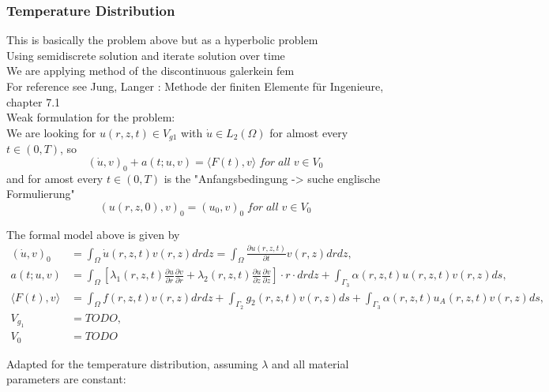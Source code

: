 \documentclass[parskip=half, titlepage=yes, 12pt, BCOR=12mm, DIV=calc]{scrartcl}
\begin{document}
\subsubsection{Temperature Distribution}

This is basically the problem above but as a hyperbolic problem \\
Using semidiscrete solution and iterate solution over time \\
We are applying method of the discontinuous galerkein fem \\
For reference see Jung, Langer : Methode der finiten Elemente für Ingenieure, chapter 7.1 \\



Weak formulation for the problem: \\

We are looking for $u(r,z,t) \in V_{g1}$ with $\Dot{u} \in L_2(\Omega)$ for almost every $t \in (0,T)$, so \\ \begin{equation}
(\Dot{u},v)_0 + a(t;u,v) = \langle F(t),v \rangle \; for \; all \; v \in V_0    
\end{equation}
and for amost every $t \in (0, T)$ is the "Anfangsbedingung -> suche englische Formulierung"
\begin{equation}
    (u(r,z,0),v)_0 = (u_0,v)_0 \; for \; all \; v \in V_0
\end{equation}

The formal model above is given by 
\begin{align*}
    (\Dot{u},v)_0 &= \int_{\Omega} \Dot{u}(r,z,t)v(r,z) drdz = \int_{\Omega} \frac{\partial u(r,z,t)}{\partial t} v(r,z) drdz, \\
    a(t;u,v) &= \int_{\Omega} \left[ \lambda_1(r,z,t) \frac{\partial u}{\partial r} \frac{\partial v}{\partial r} + \lambda_2(r,z,t) \frac{\partial u}{\partial z} \frac{\partial v}{\partial z} \right] \cdot r \cdot drdz + \int_{\Gamma_3} \alpha(r,z,t)u(r,z,t)v(r,z) ds, \\
    \langle F(t),v \rangle &= \int_{\Omega} f(r,z,t)v(r,z) drdz + \int_{\Gamma_2} g_2(r,z,t)v(r,z) ds + \int_{\Gamma_3} \alpha(r,z,t)u_A(r,z,t)v(r,z) ds, \\
    V_{g_1} &= TODO, \\
    V_0 &= TODO
\end{align*}

Adapted for the temperature distribution, assuming $\lambda$ and all material parameters are constant: 
\end{document}
